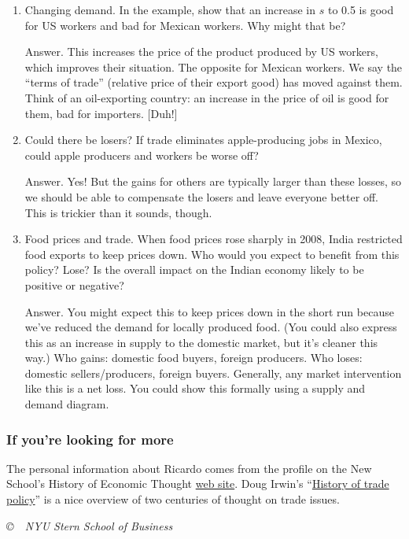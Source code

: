 \documentclass[letterpaper,12pt]{article}
\begin{document}
\begin{enumerate}
\item Changing demand.
In the example, show that an increase in $s$ to 0.5
is good for US workers and bad for Mexican workers.
Why might that be?

Answer.  This increases the price of the product produced by US workers,
which improves their situation.  The opposite for Mexican workers.
We say the ``terms of trade'' (relative price of their export good)
 has moved against them.
Think of an oil-exporting country:  an increase in the price of oil
is good for them, bad for importers.  [Duh!]

\item Could there be losers?
If trade eliminates apple-producing jobs in Mexico,
could apple producers and workers be worse off?

Answer.  Yes!  But the gains for others are typically
larger than these losses,
so we should be able to compensate the losers and leave
everyone better off.
This is trickier than it sounds, though.

\item Food prices and trade.
When food prices rose sharply in 2008, India restricted
food exports to keep prices down.
Who would you expect to benefit from this policy?  Lose?
Is the overall impact on the Indian economy likely to be
positive or negative?

Answer.  You might expect this to keep prices down in the short run
because we've reduced the demand for locally produced food.
(You could also express this as an increase in supply to the domestic market, but it's cleaner this way.)
Who gains:  domestic food buyers, foreign producers.
Who loses:  domestic sellers/producers, foreign buyers.
Generally, any market intervention like this is a net loss.
You could show this formally using a supply and demand diagram.


\end{enumerate}


\subsubsection*{If you're looking for more}

The personal information about Ricardo comes from 
the profile on the New School's
History of Economic Thought
\href{http://homepage.newschool.edu/~het/profiles/ricardo.htm}{web
site}. 
Doug Irwin's
``\href{http://www.econlib.org/library/Columns/Irwintrade.html}{History
of trade policy}'' is a nice overview of two centuries of thought on trade issues.  


\vfill \centerline{\it \copyright \ \number\year \  NYU Stern
School of Business}
\end{document}
